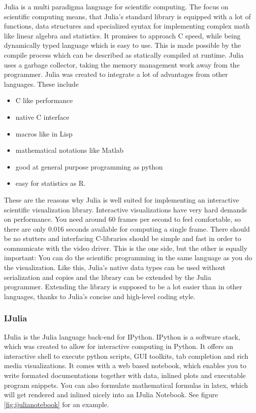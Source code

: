 Julia is a multi paradigma language for scientific computing.
The focus on scientific computing means, that Julia's standard library is equipped with a lot of functions, data structures and specialized syntax for implementing complex math like linear algebra and statistics.
It promises to approach C speed, while being dynamically typed language which is easy to use.
This is made possible by the compile process which can be described as statically compiled at runtime.
Julia uses a garbage collector, taking the memory management work away from the programmer.
Julia was created to integrate a lot of advantages from other languages.
These include \cite{WhyJulia}
\begin{itemize}
	\item C like performance
	\item native C interface
	\item macros like in Lisp
	\item mathematical notations like Matlab
	\item good at general purpose programming as python
	\item easy for statistics as R.
\end{itemize}
These are the reasons why Julia is well suited for implementing an interactive scientific visualization library.
Interactive visualizations have very hard demands on performance. 
You need around 60 frames per second to feel comfortable, so there are only 0.016 seconds available for computing a single frame.
There should be no stutters and interfacing C-libraries should be simple and fast in order to communicate with the video driver.
This is the one side, but the other is equally important:
You can do the scientific programming in the same language as you do the visualization.
Like this, Julia's native data types can be used without serialization and copies and the library can be extended by the Julia programmer.
Extending the library is supposed to be a lot easier than in other languages, thanks to Julia's concise and high-level coding style.


\subsubsection{IJulia}
IJulia is the Julia language back-end for IPython.
IPython is a software stack, which was created to allow for interactive computing in Python.
It offers an interactive shell to execute python scripts, \ac{GUI} toolkits, tab completion and rich media visualizations.
It comes with a web based notebook, which enables you to write formated documentations together with data, inlined plots and executable program snippets. You can also formulate mathematical formulas in latex, which will get rendered and inlined nicely into an IJulia Notebook.
See figure \ref{fig:ijulianotebook} for an example.

